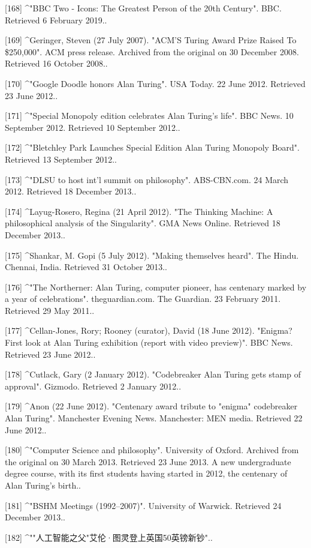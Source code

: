 [168]
^"BBC Two - Icons: The Greatest Person of the 20th Century". BBC. Retrieved 6 February 2019..

[169]
^Geringer, Steven (27 July 2007). "ACM'S Turing Award Prize Raised To \$250,000". ACM press release. Archived from the original on 30 December 2008. Retrieved 16 October 2008..

[170]
^"Google Doodle honors Alan Turing". USA Today. 22 June 2012. Retrieved 23 June 2012..

[171]
^"Special Monopoly edition celebrates Alan Turing's life". BBC News. 10 September 2012. Retrieved 10 September 2012..

[172]
^"Bletchley Park Launches Special Edition Alan Turing Monopoly Board". Retrieved 13 September 2012..

[173]
^"DLSU to host int'l summit on philosophy". ABS-CBN.com. 24 March 2012. Retrieved 18 December 2013..

[174]
^Layug-Rosero, Regina (21 April 2012). "The Thinking Machine: A philosophical analysis of the Singularity". GMA News Online. Retrieved 18 December 2013..

[175]
^Shankar, M. Gopi (5 July 2012). "Making themselves heard". The Hindu. Chennai, India. Retrieved 31 October 2013..

[176]
^"The Northerner: Alan Turing, computer pioneer, has centenary marked by a year of celebrations". theguardian.com. The Guardian. 23 February 2011. Retrieved 29 May 2011..

[177]
^Cellan-Jones, Rory; Rooney (curator), David (18 June 2012). "Enigma? First look at Alan Turing exhibition (report with video preview)". BBC News. Retrieved 23 June 2012..

[178]
^Cutlack, Gary (2 January 2012). "Codebreaker Alan Turing gets stamp of approval". Gizmodo. Retrieved 2 January 2012..

[179]
^Anon (22 June 2012). "Centenary award tribute to "enigma" codebreaker Alan Turing". Manchester Evening News. Manchester: MEN media. Retrieved 22 June 2012..

[180]
^"Computer Science and philosophy". University of Oxford. Archived from the original on 30 March 2013. Retrieved 23 June 2013. A new undergraduate degree course, with its first students having started in 2012, the centenary of Alan Turing's birth..

[181]
^"BSHM Meetings (1992–2007)". University of Warwick. Retrieved 24 December 2013..

[182]
^""人工智能之父"艾伦·图灵登上英国50英镑新钞"..

